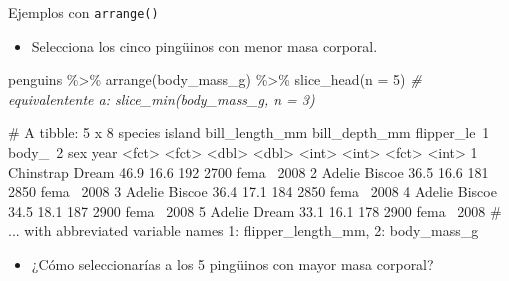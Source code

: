 \documentclass[
  ignorenonframetext,
  aspectratio=169]{beamer}
\newenvironment{Shaded}{\begin{snugshade}}{\end{snugshade}}
\newcommand{\AttributeTok}[1]{\textcolor[rgb]{0.77,0.63,0.00}{#1}}
\newcommand{\CommentTok}[1]{\textcolor[rgb]{0.56,0.35,0.01}{\textit{#1}}}
\newcommand{\DecValTok}[1]{\textcolor[rgb]{0.00,0.00,0.81}{#1}}
\newcommand{\FunctionTok}[1]{\textcolor[rgb]{0.00,0.00,0.00}{#1}}
\newcommand{\NormalTok}[1]{#1}
\newcommand{\SpecialCharTok}[1]{\textcolor[rgb]{0.00,0.00,0.00}{#1}}
\providecommand{\tightlist}{%
  \setlength{\itemsep}{0pt}\setlength{\parskip}{0pt}}
\let\oldverbatim\verbatim
\let\endoldverbatim\endverbatim
\renewenvironment{verbatim}{\tiny\oldverbatim}{\endoldverbatim}
\begin{document}
\begin{frame}[fragile]{Ejemplos con \texttt{arrange()}}
\protect\hypertarget{ejemplos-con-arrange}{}
\begin{itemize}
\tightlist
\item
  Selecciona los cinco pingüinos con menor masa corporal.
\end{itemize}

\begin{Shaded}
\begin{Highlighting}[]
\NormalTok{penguins }\SpecialCharTok{\%\textgreater{}\%} 
  \FunctionTok{arrange}\NormalTok{(body\_mass\_g) }\SpecialCharTok{\%\textgreater{}\%} 
  \FunctionTok{slice\_head}\NormalTok{(}\AttributeTok{n =} \DecValTok{5}\NormalTok{)  }\CommentTok{\# equivalentente a: slice\_min(body\_mass\_g, n = 3)}
\end{Highlighting}
\end{Shaded}

\begin{verbatim}
# A tibble: 5 x 8
  species   island bill_length_mm bill_depth_mm flipper_le~1 body_~2 sex    year
  <fct>     <fct>           <dbl>         <dbl>        <int>   <int> <fct> <int>
1 Chinstrap Dream            46.9          16.6          192    2700 fema~  2008
2 Adelie    Biscoe           36.5          16.6          181    2850 fema~  2008
3 Adelie    Biscoe           36.4          17.1          184    2850 fema~  2008
4 Adelie    Biscoe           34.5          18.1          187    2900 fema~  2008
5 Adelie    Dream            33.1          16.1          178    2900 fema~  2008
# ... with abbreviated variable names 1: flipper_length_mm, 2: body_mass_g
\end{verbatim}

\begin{itemize}
\tightlist
\item
  ¿Cómo seleccionarías a los 5 pingüinos con mayor masa corporal?
\end{itemize}
\end{frame}
\end{document}
